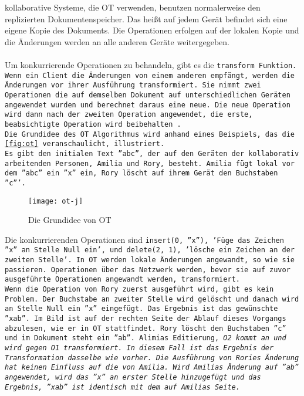%
\Gls{kollaborativ}e Systeme, die \gls{OT} verwenden, benutzen normalerweise den replizierten Dokumentenspeicher.
Das heißt auf jedem Gerät befindet sich eine eigene Kopie des Dokuments.
Die Operationen erfolgen auf der lokalen Kopie und die Änderungen werden an alle anderen Geräte weitergegeben.\\\\
%
Um konkurrierende Operationen zu behandeln, gibt es die \tt{transform} Funktion.
Wenn ein Client die Änderungen von einem anderen empfängt, werden die Änderungen vor ihrer Ausführung transformiert.
Sie nimmt zwei Operationen die auf demselben Dokument auf unterschiedlichen Geräten angewendet wurden und berechnet daraus eine neue.
Die neue Operation wird dann nach der zweiten Operation angewendet, die erste, beabsichtigte Operation wird beibehalten~\cite{ot_paper}.\\
%
Die Grundidee des \gls{OT} Algorithmus wird anhand eines Beispiels, das die \autoref{fig:ot} veranschaulicht, illustriert.\\
Es gibt den initialen Text ''abc'', der auf den Geräten der kollaborativ arbeitenden Personen, Amilia und Rory, besteht.
Amilia fügt lokal vor dem ''abc'' ein ''x'' ein, Rory löscht auf ihrem Gerät den Buchstaben ''c'''.
%
\begin{figure}[h]
  \centering
  \texttt{[image: ot-j]}
  \grayRule
  \caption{Die Grundidee von \gls{OT}}
  \label{fig:ot}
\end{figure}
%
Die konkurrierenden Operationen sind \tt{insert(0, ''x'')}, 'Füge das Zeichen ''x'' an Stelle Null ein', und \tt{delete(2, 1)}, 'lösche ein Zeichen an der zweiten Stelle'.
In \gls{OT} werden lokale Änderungen angewandt, so wie sie passieren. Operationen über das Netzwerk werden, bevor sie auf zuvor ausgeführte Operationen angewandt werden, transformiert.\\
%
Wenn die Operation von Rory zuerst ausgeführt wird, gibt es kein Problem. Der Buchstabe an zweiter Stelle wird gelöscht und danach wird an Stelle Null ein ''x'' eingefügt. Das Ergebnis ist das gewünschte ''xab''.
Im Bild ist auf der rechten Seite der Ablauf dieses Vorgangs abzulesen, wie er in \gls{OT} stattfindet.
Rory löscht den Buchstaben ''c'' und im Dokument steht ein ''ab''.
Alimias Editierung, \it{O2} kommt an und wird gegen \it{O1} transformiert. In diesem Fall ist das Ergebnis der Transformation dasselbe wie vorher.
Die Ausführung von Rories Änderung hat keinen Einfluss auf die von Amilia. Wird Amilias Änderung auf ''ab'' angewendet, wird das ''x'' an erster Stelle hinzugefügt und das Ergebnis, ''xab'' ist identisch mit dem auf Amilias Seite.\\
